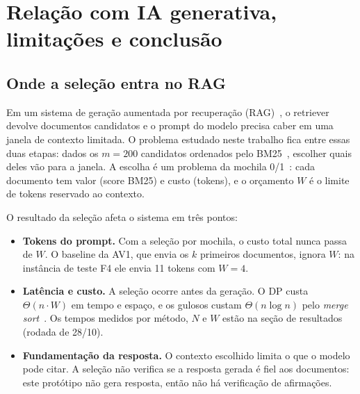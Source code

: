 \section{Relação com IA generativa, limitações e conclusão}

\subsection{Onde a seleção entra no RAG}
Em um sistema de geração aumentada por recuperação (RAG)~\cite{lewis2020}, o retriever devolve documentos candidatos e o prompt do modelo precisa caber em uma janela de contexto limitada. O problema estudado neste trabalho fica entre essas duas etapas: dados os $m = 200$ candidatos ordenados pelo BM25~\cite{robertson2009}, escolher quais deles vão para a janela. A escolha é um problema da mochila 0/1~\cite{kellerer2004}: cada documento tem valor (score BM25) e custo (tokens), e o orçamento $W$ é o limite de tokens reservado ao contexto.

O resultado da seleção afeta o sistema em três pontos:
\begin{itemize}
  \item \textbf{Tokens do prompt.} Com a seleção por mochila, o custo total nunca passa de $W$. O baseline da AV1, que envia os $k$ primeiros documentos, ignora $W$: na instância de teste F4 ele envia 11 tokens com $W = 4$.
  \item \textbf{Latência e custo.} A seleção ocorre antes da geração. O DP custa $\Theta(n \cdot W)$ em tempo e espaço, e os gulosos custam $\Theta(n \log n)$ pelo \emph{merge sort}~\cite{cormen2012}. Os tempos medidos por método, $N$ e $W$ estão na seção de resultados (rodada de 28/10).
  \item \textbf{Fundamentação da resposta.} O contexto escolhido limita o que o modelo pode citar. A seleção não verifica se a resposta gerada é fiel aos documentos: este protótipo não gera resposta, então não há verificação de afirmações.
\end{itemize}

